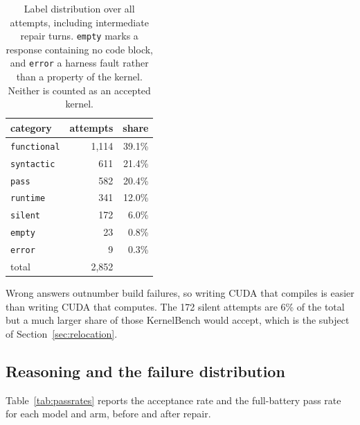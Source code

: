 \documentclass[12pt]{article}
\begin{document}
\begin{table}[h]
\centering
\begin{tabular}{lrr}
\toprule
category & attempts & share \\
\midrule
\texttt{functional} & 1{,}114 & 39.1\% \\
\texttt{syntactic}  &   611 & 21.4\% \\
\texttt{pass}       &   582 & 20.4\% \\
\texttt{runtime}    &   341 & 12.0\% \\
\texttt{silent}     &   172 &  6.0\% \\
\texttt{empty}      &    23 &  0.8\% \\
\texttt{error}      &     9 &  0.3\% \\
\midrule
total               & 2{,}852 & \\
\bottomrule
\end{tabular}
\caption{Label distribution over all attempts, including intermediate repair
turns. \texttt{empty} marks a response containing no code block, and
\texttt{error} a harness fault rather than a property of the kernel. Neither is
counted as an accepted kernel.}
\label{tab:dataset}
\end{table}

Wrong answers outnumber build failures, so writing CUDA that compiles is easier
than writing CUDA that computes. The 172 silent attempts are 6\% of the total
but a much larger share of those KernelBench would accept, which is the subject
of Section~\ref{sec:relocation}.

\subsection{Reasoning and the failure distribution}

Table~\ref{tab:passrates} reports the acceptance rate and the full-battery pass
rate for each model and arm, before and after repair.
\end{document}

